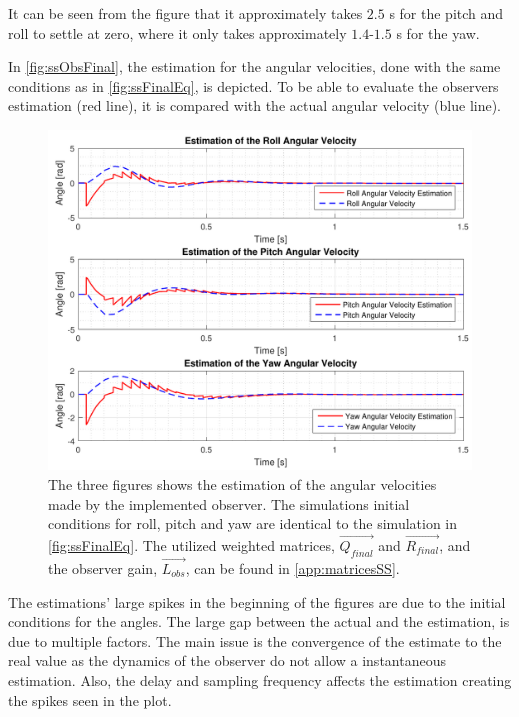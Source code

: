 
It can be seen from the figure that it approximately takes $2.5$ \si{s} for the pitch and roll to settle at zero, where it only takes approximately $1.4$-$1.5$ \si{s} for the yaw.

In \autoref{fig:ssObsFinal}, the estimation for the angular velocities, done with the same conditions as in \autoref{fig:ssFinalEq}, is depicted. To be able to evaluate the observers estimation (red line), it is compared with the actual angular velocity (blue line). \\  
%
\begin{figure}[H]
	\centering
	\includegraphics[scale=0.7]{figures/ssObsFinal.pdf}
	\caption{The three figures shows the estimation of the angular velocities made by the implemented observer. The simulations initial conditions for roll, pitch and yaw are identical to the simulation in \autoref{fig:ssFinalEq}. The utilized weighted matrices, $\vec{Q_{final}}$ and $\vec{R_{final}}$, and the observer gain, $\vec{L_{obs}}$, can be found in \autoref{app:matricesSS}.}
	\label{fig:ssObsFinal}
\end{figure}
%
The estimations' large spikes in the beginning of the figures are due to the initial conditions for the angles. The large gap between the actual and the estimation, is due to multiple factors. The main issue is the convergence of the estimate to the real value as the dynamics of the observer do not allow a instantaneous estimation. Also, the delay and sampling frequency affects the estimation creating the spikes seen in the plot. %

